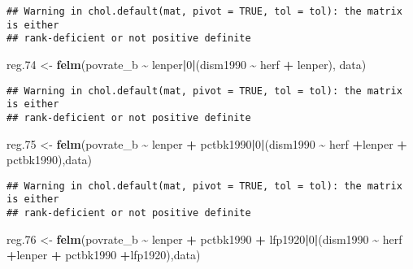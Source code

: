 \documentclass[
]{article}
\newenvironment{Shaded}{\begin{snugshade}}{\end{snugshade}}
\newcommand{\DecValTok}[1]{\textcolor[rgb]{0.00,0.00,0.81}{#1}}
\newcommand{\FloatTok}[1]{\textcolor[rgb]{0.00,0.00,0.81}{#1}}
\newcommand{\FunctionTok}[1]{\textcolor[rgb]{0.13,0.29,0.53}{\textbf{#1}}}
\newcommand{\NormalTok}[1]{#1}
\newcommand{\OtherTok}[1]{\textcolor[rgb]{0.56,0.35,0.01}{#1}}
\newcommand{\SpecialCharTok}[1]{\textcolor[rgb]{0.81,0.36,0.00}{\textbf{#1}}}
\begin{document}
\begin{verbatim}
## Warning in chol.default(mat, pivot = TRUE, tol = tol): the matrix is either
## rank-deficient or not positive definite
\end{verbatim}

\begin{Shaded}
\begin{Highlighting}[]
\NormalTok{reg}\FloatTok{.74} \OtherTok{\textless{}{-}} \FunctionTok{felm}\NormalTok{(povrate\_b }\SpecialCharTok{\textasciitilde{}}\NormalTok{ lenper}\SpecialCharTok{|}\DecValTok{0}\SpecialCharTok{|}\NormalTok{(dism1990 }\SpecialCharTok{\textasciitilde{}}\NormalTok{ herf }\SpecialCharTok{+}\NormalTok{ lenper), data)}
\end{Highlighting}
\end{Shaded}

\begin{verbatim}
## Warning in chol.default(mat, pivot = TRUE, tol = tol): the matrix is either
## rank-deficient or not positive definite
\end{verbatim}

\begin{Shaded}
\begin{Highlighting}[]
\NormalTok{reg}\FloatTok{.75} \OtherTok{\textless{}{-}} \FunctionTok{felm}\NormalTok{(povrate\_b }\SpecialCharTok{\textasciitilde{}}\NormalTok{ lenper }\SpecialCharTok{+}\NormalTok{ pctbk1990}\SpecialCharTok{|}\DecValTok{0}\SpecialCharTok{|}\NormalTok{(dism1990 }\SpecialCharTok{\textasciitilde{}}\NormalTok{ herf }\SpecialCharTok{+}\NormalTok{lenper }\SpecialCharTok{+}\NormalTok{ pctbk1990),data)}
\end{Highlighting}
\end{Shaded}

\begin{verbatim}
## Warning in chol.default(mat, pivot = TRUE, tol = tol): the matrix is either
## rank-deficient or not positive definite
\end{verbatim}

\begin{Shaded}
\begin{Highlighting}[]
\NormalTok{reg}\FloatTok{.76} \OtherTok{\textless{}{-}} \FunctionTok{felm}\NormalTok{(povrate\_b }\SpecialCharTok{\textasciitilde{}}\NormalTok{ lenper }\SpecialCharTok{+}\NormalTok{ pctbk1990 }\SpecialCharTok{+}\NormalTok{ lfp1920}\SpecialCharTok{|}\DecValTok{0}\SpecialCharTok{|}\NormalTok{(dism1990 }\SpecialCharTok{\textasciitilde{}}\NormalTok{ herf }\SpecialCharTok{+}\NormalTok{lenper }\SpecialCharTok{+}\NormalTok{ pctbk1990 }\SpecialCharTok{+}\NormalTok{lfp1920),data)}
\end{Highlighting}
\end{Shaded}
\end{document}
